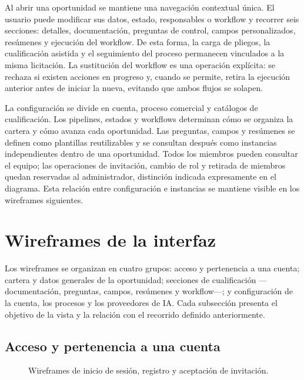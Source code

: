 Al abrir una oportunidad se mantiene una navegación contextual única. El
usuario puede modificar sus datos, estado, responsables o workflow y recorrer
seis secciones: detalles, documentación, preguntas de control, campos
personalizados, resúmenes y ejecución del workflow. De esta forma, la carga de
pliegos, la cualificación asistida y el seguimiento del proceso permanecen
vinculados a la misma licitación. La sustitución del workflow es una operación
explícita: se rechaza si existen acciones en progreso y, cuando se permite,
retira la ejecución anterior antes de iniciar la nueva, evitando que ambos
flujos se solapen.

La configuración se divide en cuenta, proceso comercial y catálogos de
cualificación. Los pipelines, estados y workflows determinan cómo se organiza
la cartera y cómo avanza cada oportunidad. Las preguntas, campos y resúmenes se
definen como plantillas reutilizables y se consultan después como instancias
independientes dentro de una oportunidad. Todos los miembros pueden consultar
el equipo; las operaciones de invitación, cambio de rol y retirada de miembros
quedan reservadas al administrador, distinción indicada expresamente en el
diagrama. Esta relación entre configuración e instancias se mantiene visible en
los wireframes siguientes.

\section{Wireframes de la interfaz}

Los wireframes se organizan en cuatro grupos: acceso y pertenencia a una cuenta;
cartera y datos generales de la oportunidad; secciones de cualificación
---documentación, preguntas, campos, resúmenes y workflow---; y configuración
de la cuenta, los procesos y los proveedores de IA. Cada subsección presenta el
objetivo de la vista y la relación con el recorrido definido anteriormente.

\subsection{Acceso y pertenencia a una cuenta}

\begin{figure}[H]
  \centering
  \resizebox{\textwidth}{!}{
    
  }
  \caption{Wireframes de inicio de sesión, registro y aceptación de invitación.}
  \label{fig:wireframes-access}
\end{figure}

